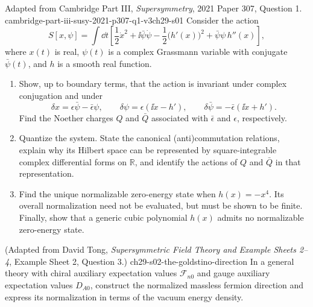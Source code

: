 
\begin{enumerate}
    {Adapted from Cambridge Part III, \emph{Supersymmetry}, 2021
    Paper 307, Question 1.}
    {cambridge-part-iii-susy-2021-p307-q1-v3ch29-s01}
  Consider the action
  \[
    S[x,\psi]=\int \dd t\left[
      \frac12\dot x^2+\ii\bar\psi\dot\psi
      -\frac12\bigl(h'(x)\bigr)^2
      +\bar\psi\psi\,h''(x)\right],
    \tag{29.1.1}
  \]
  where \(x(t)\) is real, \(\psi(t)\) is a complex Grassmann variable
  with conjugate \(\bar\psi(t)\), and \(h\) is a smooth real function.
  \begin{enumerate}
    \item Show, up to boundary terms, that the action is invariant under
    complex conjugation and under
    \[
      \delta x=\epsilon\bar\psi-\bar\epsilon\psi,
      \qquad
      \delta\psi=\epsilon(\ii\dot x-h'),
      \qquad
      \delta\bar\psi=-\bar\epsilon(\ii\dot x+h').
      \tag{29.1.2}
    \]
    Find the Noether charges \(Q\) and \(\bar Q\) associated with
    \(\bar\epsilon\) and \(\epsilon\), respectively.

    \item Quantize the system.  State the canonical (anti)commutation
    relations, explain why its Hilbert space can be represented by
    square-integrable complex differential forms on \(\mathbb R\), and
    identify the actions of \(Q\) and \(\bar Q\) in that representation.

    \item Find the unique normalizable zero-energy state when
    \(h(x)=-x^4\).  Its overall normalization need not be evaluated, but
    must be shown to be finite.  Finally, show that a generic cubic
    polynomial \(h(x)\) admits no normalizable zero-energy state.
  \end{enumerate}

    {(Adapted from David Tong, \emph{Supersymmetric Field Theory and Example Sheets 2--4}, Example Sheet 2, Question 3.)}
    {ch29-s02-the-goldstino-direction}
In a general theory with chiral auxiliary expectation values
  \(\mathcal F_{n0}\) and gauge auxiliary expectation values \(D_{A0}\),
  construct the normalized massless fermion direction and express its
  normalization in terms of the vacuum energy density.


\end{enumerate}
